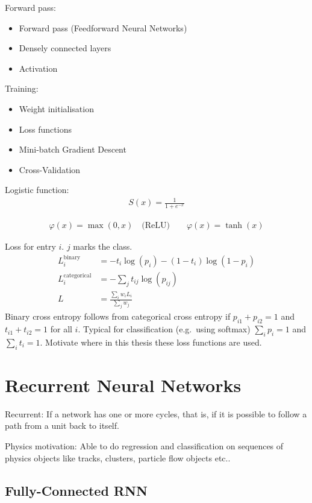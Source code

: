 Forward pass:
\begin{itemize}
\item Forward pass (Feedforward Neural Networks)
\item Densely connected layers
\item Activation
\end{itemize}
Training:
\begin{itemize}
\item Weight initialisation
\item Loss functions
\item Mini-batch Gradient Descent
\item Cross-Validation
\end{itemize}

Logistic function:
\begin{align*}
  S(x) = \frac{1}{1 + e^{-x}}
\end{align*}

\begin{align*}
  \varphi(x) = \max(0, x) \quad \text{(ReLU)} \qquad \varphi(x) = \tanh(x)
\end{align*}

Loss for entry $i$. $j$ marks the class.
\begin{align*}
  L_i^\mathrm{binary} &= -t_i \log(p_i) - (1 - t_i) \log(1 - p_i) \\
  L_i^\mathrm{categorical} &= - \sum_j t_{ij} \log(p_{ij}) \\
  L &= \frac{\sum_i w_i L_i}{\sum_j w_j}
\end{align*}
Binary cross entropy follows from categorical cross entropy if
$p_{i1} + p_{i2} = 1$ and $t_{i1} + t_{i2} = 1$ for all $i$. Typical for
classification (e.g.\ using softmax) $\sum_i p_i = 1$ and $\sum_i t_i = 1$.
Motivate where in this thesis these loss functions are used.

\section{Recurrent Neural Networks}
\label{sec:rnn}

Recurrent: If a network has one or more cycles, that is, if it is possible to
follow a path from a unit back to itself.

Physics motivation: Able to do regression and classification on sequences of
physics objects like tracks, clusters, particle flow objects etc..

\subsection{Fully-Connected RNN}
\label{sec:fully_connected_rnn}


